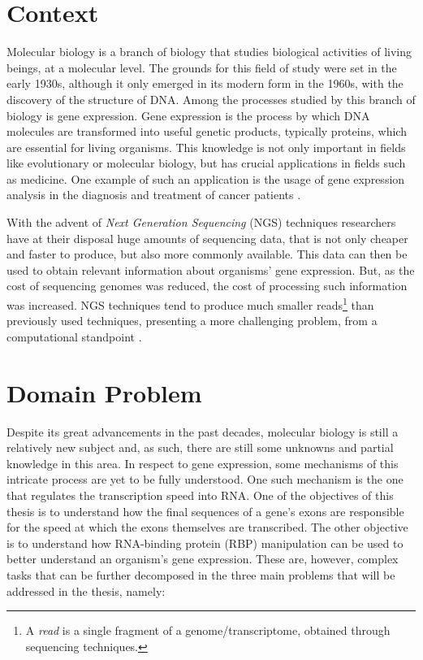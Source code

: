 \documentclass[9pt,a4paper]{extarticle}
\begin{document}
\begin{multicols}{2}

\section{Context} \label{sec:context}

Molecular biology is a branch of biology that studies biological activities of
living beings, at a molecular level. The grounds for this field of study were
set in the early 1930s, although it only emerged in its modern form in the
1960s, with the discovery of the structure of DNA. Among the processes studied
by this branch of biology is gene expression. Gene expression is the process by
which DNA molecules are transformed into useful genetic products, typically
proteins, which are essential for living organisms. This knowledge is not only
important in fields like evolutionary or molecular biology, but has crucial
applications in fields such as medicine. One example of such an application is
the usage of gene expression analysis in the diagnosis and treatment of cancer
patients \cite{Pusztai01062003}.

With the advent of \textit{Next Generation Sequencing} (NGS) techniques
researchers have at their disposal huge amounts of sequencing data, that is not
only cheaper and faster to produce, but also more commonly available. This data
can then be used to obtain relevant information about organisms' gene
expression. But, as the cost of sequencing genomes was reduced, the cost of
processing such information was increased. NGS techniques tend to produce much
smaller reads\footnote{A \textit{read} is a single fragment of a
genome/transcriptome, obtained through sequencing techniques.} than previously
used techniques, presenting a more challenging problem, from a computational
standpoint \cite{Wolf2013}.

\section{Domain Problem} \label{sec:problem}

Despite its great advancements in the past decades, molecular biology is still a
relatively new subject and, as such, there are still some unknowns and partial
knowledge in this area. In respect to gene expression, some mechanisms of this
intricate process are yet to be fully understood. One such mechanism is the one
that regulates the transcription speed into RNA. One of the objectives of this
thesis is to understand how the final sequences of a gene's exons are
responsible for the speed at which the exons themselves are transcribed. The
other objective is to understand how RNA-binding protein (RBP) manipulation can
be used to better understand an organism's gene expression. These are, however,
complex tasks that can be further decomposed in the three main problems that
will be addressed in the thesis, namely:


\end{multicols}
\end{document}
